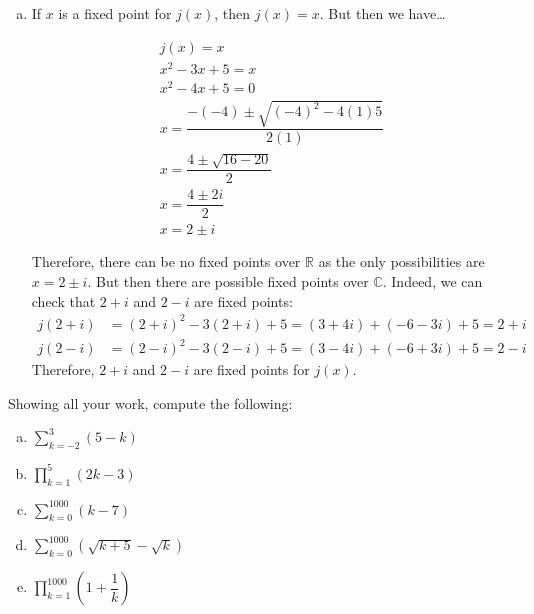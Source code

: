 \documentclass[12pt,letterpaper]{exam}
\begin{document}
\begin{questions}
{\begin{enumerate}[(a)]
\item If $x$ is a fixed point for $j(x)$, then $j(x)= x$. But then we have\dots
	
	\begin{gather*}
	j(x)= x \\[0.3cm]
	x^2 - 3x + 5= x \\[0.3cm]
	x^2 - 4x + 5= 0 \\[0.3cm]
	x= \dfrac{-(-4) \pm \sqrt{(-4)^2 - 4(1)5}}{2(1)} \\[0.3cm]
	x= \dfrac{4 \pm \sqrt{16 - 20}}{2} \\[0.3cm]
	x= \dfrac{4 \pm 2i}{2} \\[0.3cm]
	x= 2 \pm i
	\end{gather*}

Therefore, there can be no fixed points over $\mathbb{R}$ as the only possibilities are $x= 2 \pm i$. But then there are possible fixed points over $\mathbb{C}$. Indeed, we can check that $2 + i$ and $2 - i$ are fixed points:
	\[
	\begin{aligned}
	j(2 + i)&= (2 + i)^2 - 3(2 + i) + 5=  (3 + 4i) + (-6 - 3i) + 5= 2 + i \\
	j(2 - i)&= (2 - i)^2 - 3(2 - i) + 5= (3 - 4i) + (-6 + 3i) + 5= 2 - i
	\end{aligned}
	\]
Therefore, $2 + i$ and $2 - i$ are fixed points for $j(x)$. 
\end{enumerate}
}



\newpage
\question[10] Showing all your work, compute the following:
	\begin{enumerate}[(a)]
	\item $\displaystyle \sum_{k= -2}^3 (5 - k)$
	\item $\displaystyle \prod_{k=1}^5 (2k - 3)$ 
	\item $\displaystyle \sum_{k=0}^{1000} (k - 7)$
	\item $\displaystyle \sum_{k=0}^{1000} \left( \sqrt{k + 5} - \sqrt{k} \right)$
	\item $\displaystyle \prod_{k=1}^{1000} \left(1 + \dfrac{1}{k} \right)$
	\end{enumerate} 

\sol {\itshape
\begin{enumerate}[(a)]
\item 
	\[
	\sum_{k= -2}^3 (5 - k)= 7 + 6 + 5 + 4 + 3 + 2= 27
	\] 

\item 
	\[
	\prod_{k=1}^5 (2k - 3)= -1 \cdot 1 \cdot 3 \cdot 5 \cdot 7= -105
	\] 


\end{enumerate}}
\end{questions}
\end{document}

